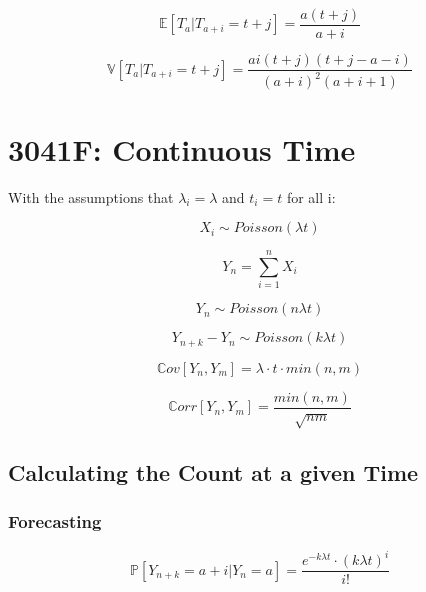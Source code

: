 \documentclass[12pt]{article}
\begin{document}
\begin{equation}
    \mathbb{E}[T_a | T_{a + i} = t + j] = \frac{a (t + j)}{ a + i }
\end{equation}


\begin{equation}
    \mathbb{V}[T_a | T_{a + i} = t + j] = 
    \frac{
        a i (t + j) (t + j - a - i)
        }{
        (a + i)^2 (a + i + 1)
    }
\end{equation}
\section{3041F: Continuous Time}
With the assumptions that \(\lambda_i = \lambda\) and \(t_i = t\) for all i:

\begin{equation}
    X_i \sim Poisson(\lambda t)
\end{equation}

\begin{equation}
    Y_n = \sum_{i = 1}^{n} X_i
\end{equation}

\begin{equation}
    Y_n \sim Poisson(n \lambda t)
\end{equation}

\begin{equation}
    Y_{n+k} - Y_n \sim Poisson(k \lambda t)
\end{equation}

\begin{equation}
    \mathbb{C}ov[Y_n, Y_m] = \lambda \cdot t \cdot min(n, m)
\end{equation}

\begin{equation}
    \mathbb{C}orr[Y_n, Y_m] = \frac{min(n, m)}{\sqrt{nm}}
\end{equation}

\subsection{Calculating the Count at a given Time}
\subsubsection{Forecasting}
\begin{equation}
    \mathbb{P}[Y_{n + k} = a + i | Y_n = a] =
    \frac{
        e^{-k \lambda t} \cdot (k \lambda t)^i
    }{ i! }
\end{equation}
\end{document}
